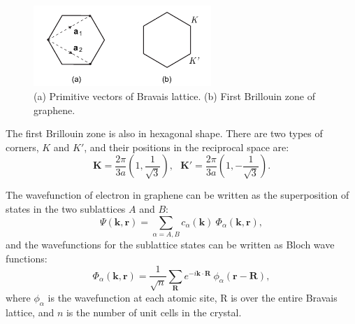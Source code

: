 \documentclass[pdflatex, sectionletters, 12pt]{pittetd}    %
\begin{document}
\begin{figure}[h!]
	\centering
	\includegraphics[width=0.6\textwidth]{Drawing/Bravais.pdf}
	\caption{(a) Primitive vectors of Bravais lattice. (b) First Brillouin zone of graphene.}
	\label{FIG:Bravais}
\end{figure}

The first Brillouin zone is also in hexagonal shape. There are two types of corners, $K$ and $K'$, and their positions in the reciprocal space are:
$$\mathbf{K} = \frac{2\pi}{3a}\left(1, \frac{1}{\sqrt{3}}\right), \ \ \ \mathbf{K'} =  \frac{2\pi}{3a}\left(1, -\frac{1}{\sqrt{3}}\right).$$

The wavefunction of electron in graphene can be written as the superposition of states in the two sublattices $A$ and $B$:
$$\Psi(\mathbf{k}, \mathbf{r}) = \sum_{\alpha = A, B}c_{\alpha}(\mathbf{k}) \ \Phi_{\alpha}(\mathbf{k}, \mathbf{r}),$$
and the wavefunctions for the sublattice states can be written as Bloch wave functions:
$$\Phi_{\alpha}(\mathbf{k}, \mathbf{r}) = \frac{1}{\sqrt{n}}\sum_\mathbf{R} e^{-i \mathbf{k} \cdot \mathbf{R}} \ \phi_{\alpha}(\mathbf{r} - \mathbf{R}),$$
where $\phi_{\alpha}$ is the wavefunction at each atomic site, R is over the entire Bravais lattice, and $n$ is the number of unit cells in the crystal. 
\end{document}
